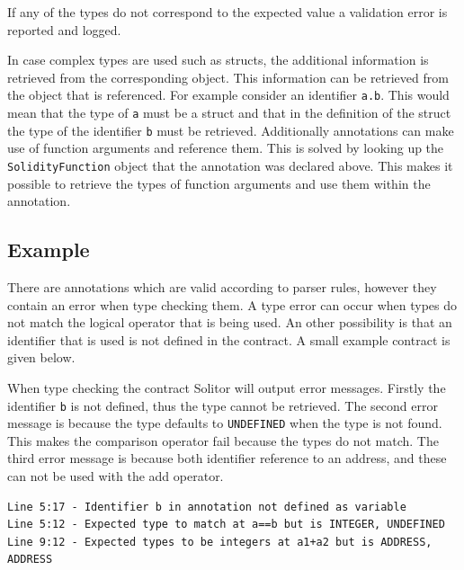 \documentclass[a4paper]{article}
\begin{document}
If any of the types do not correspond to the expected value a validation error is reported and logged. \par
In case complex types are used such as structs, the additional information is retrieved from the corresponding object. This information can be retrieved from the object that is referenced. For example consider an identifier \texttt{a.b}. This would mean that the type of \texttt{a} must be a struct and that in the definition of the struct the type of the identifier \texttt{b} must be retrieved. Additionally annotations can make use of function arguments and reference them. This is solved by looking up the \texttt{SolidityFunction} object that the annotation was declared above. This makes it possible to retrieve the types of function arguments and use them within the annotation.

\subsection{Example}
There are annotations which are valid according to parser rules, however they contain an error when type checking them. A type error can occur when types do not match the logical operator that is being used. An other possibility is that an identifier that is used is not defined in the contract. A small example contract is given below.

When type checking the contract Solitor will output error messages. Firstly the identifier \texttt{b} is not defined, thus the type cannot be retrieved. The second error message is because the type defaults to \texttt{UNDEFINED} when the type is not found. This makes the comparison operator fail because the types do not match. The third error message is because both identifier reference to an address, and these can not be used with the add operator.
\begin{lstlisting}
Line 5:17 - Identifier b in annotation not defined as variable
Line 5:12 - Expected type to match at a==b but is INTEGER, UNDEFINED
Line 9:12 - Expected types to be integers at a1+a2 but is ADDRESS, ADDRESS
\end{lstlisting}

\newpage
\end{document}
